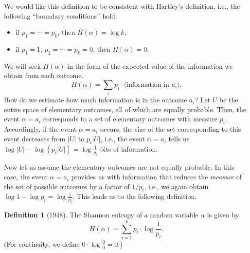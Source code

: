 \documentclass[12pt,sans]{article}
\theoremstyle{definition}
\newtheorem{definition}{Definition}[section]
\theoremstyle{plain}
\theoremstyle{remark}
\begin{document}
We would like this definition to be consistent with Hartley's definition, i.e., the following ``boundary conditions'' hold:
\begin{itemize}
    \item if \(p_1 = \dotsb = p_k\), then \(H(\alpha) = \log k\),
    \item if \(p_1 = 1\), \(p_2 = \dotsb = p_k = 0\), then \(H(\alpha) = 0\).
\end{itemize}
We will seek \(H(\alpha)\) in the form of the expected value of the information we obtain from each outcome.
\[
H(\alpha) = \sum_i p_i \cdot \text{(information in $a_i$)}.
\]
How do we estimate how much information is in the outcome $a_i$? Let $U$ be the entire space of elementary outcomes, all of which are equally probable. Then, the event \(\alpha = a_i\) corresponds to a set of elementary outcomes with measure \(p_i\). Accordingly, if the event \(\alpha = a_i\) occurs, the size of the set corresponding to this event decreases from \(|U|\) to \(p_i |U|\), i.e., the event \(\alpha = a_i\) tells us \(\log |U| - \log (p_i |U|) = \log \frac{1}{p_i}\) bits of information.

Now let us assume the elementary outcomes are not equally probable. In this case, the event \(\alpha = a_i\) provides us with information that reduces the \emph{measure} of the set of possible outcomes by a factor of \(1/p_i\), i.e., we again obtain \(\log 1 - \log p_i = \log \frac{1}{p_i}\). This leads us to the following definition.
\begin{definition}[1948]
    The Shannon entropy of a random variable \(\alpha\) is given by
    \[
    H(\alpha) = \sum_{i=1}^k p_i \cdot \log \frac{1}{p_i}.
    \]
    (For continuity, we define \(0 \cdot \log \frac{0}{0} = 0\).)
\end{definition}
\end{document}
